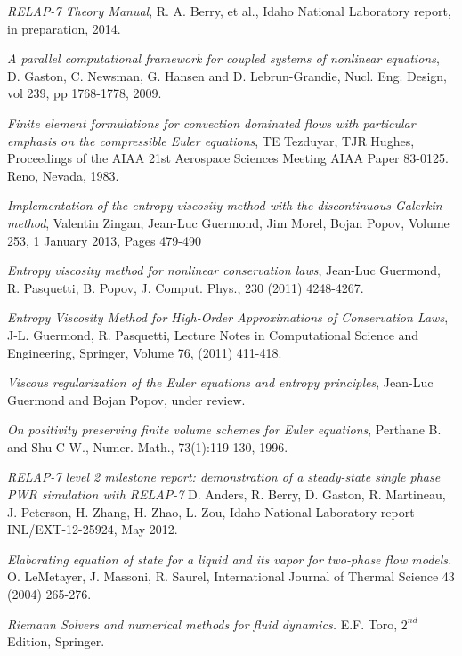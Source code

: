 \documentclass[12pt]{article}
\begin{document}
\begin{thebibliography}{11}

  \emph{RELAP-7 Theory Manual},
  R. A. Berry, et al., Idaho National Laboratory report, in preparation, 2014.
    
  \emph{A parallel computational framework for coupled systems of nonlinear equations},
  D. Gaston, C. Newsman, G. Hansen and D. Lebrun-Grandie, Nucl. Eng. Design, vol 239, pp 1768-1778, 2009.
  
  \emph{Finite element formulations for convection dominated flows with particular emphasis on the compressible Euler equations},
  TE Tezduyar, TJR Hughes, Proceedings of the AIAA 21st Aerospace Sciences Meeting AIAA Paper 83-0125. Reno, Nevada, 1983.
  
  \emph{Implementation of the entropy viscosity method with the discontinuous Galerkin method},
  Valentin Zingan, Jean-Luc Guermond, Jim Morel, Bojan Popov, Volume 253, 1 January 2013, Pages 479-490
  
  {\em Entropy viscosity method for nonlinear conservation laws}, 
  Jean-Luc Guermond, R. Pasquetti, B. Popov, J. Comput. Phys., 230 (2011) 4248-4267.
  
  {\em Entropy Viscosity Method for High-Order Approximations of Conservation Laws}, 
  J-L. Guermond, R. Pasquetti, 
  Lecture Notes in Computational Science and Engineering, Springer, Volume 76, (2011) 411-418.
  
  \emph{Viscous regularization of the Euler equations and entropy principles},
  Jean-Luc Guermond and Bojan Popov, under review.
  
  \emph{On positivity preserving finite volume schemes for Euler equations},
  Perthane B. and Shu C-W., Numer. Math., 73(1):119-130, 1996.
  
  \emph{RELAP-7 level 2 milestone report: demonstration of a steady-state single phase PWR simulation with RELAP-7}
  D. Anders, R. Berry, D. Gaston, R. Martineau, J. Peterson, H. Zhang, H. Zhao, L. Zou, Idaho National Laboratory report INL/EXT-12-25924, May 2012.
  
  \emph{Elaborating equation of state for a liquid and its vapor for two-phase flow models.}
  O. LeMetayer, J. Massoni, R. Saurel, International Journal of Thermal Science 43 (2004) 265-276.

  \emph{Riemann Solvers and numerical methods for fluid dynamics.}
  E.F. Toro, $2^{nd}$ Edition, Springer.  
  
  
  \end{thebibliography}
\end{document}
